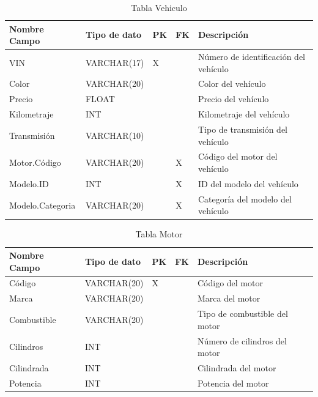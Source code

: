 \documentclass[12pt]{article}
\begin{document}
\begin{table}[htbp]
    \begin{center}
        \begin{tabular}{|p{3cm}|p{3cm}|p{1cm}|p{1cm}|p{6cm}|}
            \hline
            Nombre Campo & Tipo de dato & PK & FK & Descripción \\
            \hline
            VIN & VARCHAR(17) & X &  & Número de identificación del vehículo \\
            Color & VARCHAR(20) &  &  & Color del vehículo \\
            Precio & FLOAT &  &  & Precio del vehículo \\
            Kilometraje & INT &  &  & Kilometraje del vehículo \\
            Transmisión & VARCHAR(10) &  &  & Tipo de transmisión del vehículo \\
            Motor.Código & VARCHAR(20) &  & X & Código del motor del vehículo \\
            Modelo.ID & INT &  & X & ID del modelo del vehículo \\
            Modelo.Categoria & VARCHAR(20) &  & X & Categoría del modelo del vehículo \\
            \hline
            \end{tabular}
        \caption{Tabla Vehiculo}
        \label{tab:tablas}
    \end{center}
\end{table}


\begin{table}[htbp]
    \begin{center}
        \begin{tabular}{|p{3cm}|p{3cm}|p{1cm}|p{1cm}|p{6cm}|}
            \hline
            Nombre Campo & Tipo de dato & PK & FK & Descripción \\
            \hline
            Código & VARCHAR(20) & X &  & Código del motor \\
            Marca & VARCHAR(20) &  &  & Marca del motor \\
            Combustible & VARCHAR(20) &  &  & Tipo de combustible del motor \\
            Cilindros & INT &  &  & Número de cilindros del motor \\
            Cilindrada & INT &  &  & Cilindrada del motor \\
            Potencia & INT &  &  & Potencia del motor \\
            \hline
            \end{tabular}
        \caption{Tabla Motor}
        \label{tab:tablas}
    \end{center}
\end{table}
\end{document}
